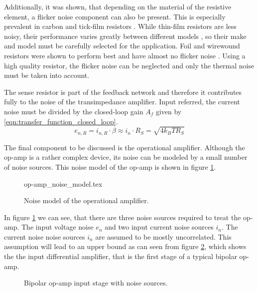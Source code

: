 Additionally, it was shown, that depending on the material of the resistive element, a flicker noise component can also be present. This is especially prevalent in carbon and tick-film resistors \cite{flicker_noise_carbon_film,1_f_noise_thick_film}. While thin-film resistors are less noisy, their performance varies greatly between different models \cite{resistor_current_noise_ligo}, so their make and model must be carefully selected for the application. Foil and wirewound resistors were shown to perform best and have almost no flicker noise \cite{resistor_current_noise_ligo,flicker_noise_foil_resistor_beev}. Using a high quality resistor, the flicker noise can be neglected and only the thermal noise must be taken into account.

The sense resistor is part of the feedback network and therefore it contributes fully to the noise of the transimpedance amplifier. Input referred, the current noise must be divided by the closed-loop gain $A_f$ given by \ref{eqn:transfer_function_closed_loop}.
\begin{equation}
    e_{n,R} = i_{n,R} \cdot \beta \approx i_n \cdot R_S = \sqrt{4 k_B T R_S} \label{eqn:noise_sense_resistor}
\end{equation}

The final component to be discussed is the operational amplifier. Although the op-amp is a rather complex device, its noise can be modeled by a small number of noise sources. This noise model of the op-amp is shown in figure \ref{fig:op-amp_noise_model}.

\begin{figure}[ht]
    \centering
        {op-amp_noise_model.tex}
    \caption{Noise model of the operational amplifier.}
    \label{fig:op-amp_noise_model}
\end{figure}

In figure \ref{fig:op-amp_noise_model} we can see, that there are three noise sources required to treat the op-amp. The input voltage noise $e_{n}$ and two input current noise sources $i_n$. The current noise noise sources $i_n$ are assumed to be mostly uncorrelated. This assumption will lead to an upper bound as can seen from figure \ref{fig:op-amp_input_stage}, which shows the the input differential amplifier, that is the first stage of a typical bipolar op-amp.

\begin{figure}[hb]
    \centering
    \caption{Bipolar op-amp input stage with noise sources.}
    \label{fig:op-amp_input_stage}
\end{figure}

